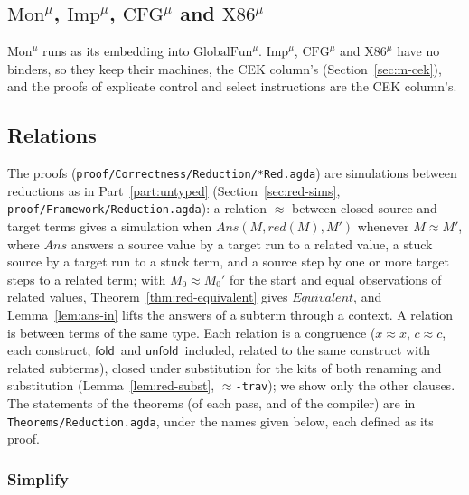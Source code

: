\documentclass[10pt]{article}
\theoremstyle{acmplain}
\newcommand{\key}[1]{\mathsf{#1}}
\newcommand{\Equiv}{\mathit{Equivalent}}
\newcommand{\Ml}[1]{\textrm{#1}^{\mu}}                  %
\newcommand{\Mfold}{\key{fold}\,}
\newcommand{\Munfold}{\key{unfold}\,}
\begin{document}
\subsection{\texorpdfstring{$\Ml{Mon}$, $\Ml{Imp}$, $\Ml{CFG}$ and $\Ml{X86}$}{Mon-mu, Imp-mu, CFG-mu and X86-mu}}

$\Ml{Mon}$ runs as its embedding into $\Ml{GlobalFun}$. $\Ml{Imp}$, $\Ml{CFG}$ and
$\Ml{X86}$ have no binders, so they keep their machines, the CEK column's
(Section~\ref{sec:m-cek}), and the proofs of explicate control and select
instructions are the CEK column's.

\subsection{Relations}\label{sec:m-red-rel}

The proofs (\texttt{proof/Correctness/Reduction/*Red.agda}) are simulations
between reductions as in Part~\ref{part:untyped}
(Section~\ref{sec:red-sims}, \texttt{proof/Framework/Reduction.agda}): a
relation $\approx$ between closed source and target terms gives a
simulation when $\mathit{Ans}(M, \mathit{red}(M), M')$ whenever $M \approx
M'$, where $\mathit{Ans}$ answers a source value by a target run to a
related value, a stuck source by a target run to a stuck term, and a
source step by one or more target steps to a related term; with
$M_0 \approx M_0'$ for the start and equal observations of related values,
Theorem~\ref{thm:red-equivalent} gives $\Equiv$, and
Lemma~\ref{lem:ans-in} lifts the answers of a subterm through a context.
A relation is between terms of the same type. Each relation is a
congruence ($x \approx x$, $c \approx c$, each construct, $\Mfold$ and
$\Munfold$ included, related to the same construct with related subterms),
closed under substitution for the kits of both renaming and substitution
(Lemma~\ref{lem:red-subst}, \texttt{$\approx$-trav}); we show only the other
clauses. The statements of the theorems (of each pass, and of the
compiler) are in \texttt{Theorems/\allowbreak Reduction.agda}, under the names given
below, each defined as its proof.

\subsubsection{Simplify}
\end{document}
